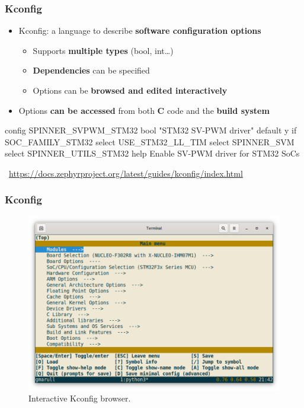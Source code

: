 \documentclass[handout]{beamer}
\begin{document}
\begin{frame}[fragile]
  \frametitle{Kconfig}

  \begin{itemize}
    \item<1-> Kconfig: a language to describe \textbf{software configuration
            options}
          \begin{itemize}
            \item Supports \textbf{multiple types} (bool, int\ldots)
            \item \textbf{Dependencies} can be specified
            \item Options can be \textbf{browsed and edited interactively}
          \end{itemize}
    \item<3-> Options \textbf{can be accessed} from both \textbf{C} code and the
          \textbf{build system}
  \end{itemize}

  \begin{codebox}[kconfig]
    config SPINNER_SVPWM_STM32
      bool "STM32 SV-PWM driver"
      default y if SOC_FAMILY_STM32
      select USE_STM32_LL_TIM
      select SPINNER_SVM
      select SPINNER_UTILS_STM32
      help
        Enable SV-PWM driver for STM32 SoCs
  \end{codebox}

  \begin{center}
    \tiny
    \faLifeRing~\url{https://docs.zephyrproject.org/latest/guides/kconfig/index.html}
  \end{center}
\end{frame}

\begin{frame}
  \frametitle{Kconfig}

  \begin{figure}
    \centering
    \includegraphics[scale=0.25]{kconfig.png}
    \caption{Interactive Kconfig browser.}
  \end{figure}
\end{frame}
\end{document}

